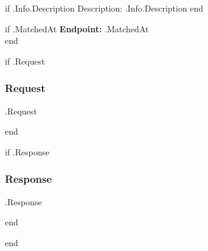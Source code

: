 \documentclass{article}
\begin{document}
	{{if .Info.Description}}
	Description: {{ .Info.Description }}
	{{end}}

	{{if .MatchedAt }}
	\smallskip
	\noindent
	\textbf{Endpoint: }{{ .MatchedAt}}\\
	{{end}}

	{{if .Request}}

	\subsubsection{Request}

\begin{samepage}
    \begin{Highlighting}
{{.Request}} 
    \end{Highlighting}
\end{samepage}
	{{end}}

	{{if .Response}}
    \subsubsection{Response}
\begin{samepage}
    \begin{Highlighting}
{{.Response}}
    \end{Highlighting}
\end{samepage}
	{{end}}
 
{{end}}

\end{document}
